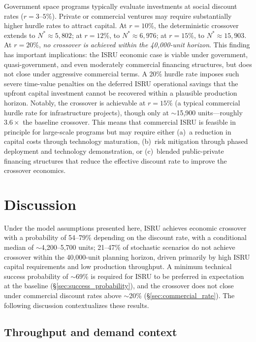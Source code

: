 \documentclass[preprint,12pt]{elsarticle}
\begin{document}
Government space programs typically evaluate investments at social discount rates ($r = 3$--$5\%$). Private or commercial ventures may require substantially higher hurdle rates to attract capital. At $r = 10\%$, the deterministic crossover extends to $N^* \approx 5{,}802$; at $r = 12\%$, to $N^* \approx 6{,}976$; at $r = 15\%$, to $N^* \approx 15{,}903$. At $r = 20\%$, \emph{no crossover is achieved within the 40{,}000-unit horizon}. This finding has important implications: the ISRU economic case is viable under government, quasi-government, and even moderately commercial financing structures, but does not close under aggressive commercial terms. A 20\% hurdle rate imposes such severe time-value penalties on the deferred ISRU operational savings that the upfront capital investment cannot be recovered within a plausible production horizon. Notably, the crossover is achievable at $r = 15\%$ (a typical commercial hurdle rate for infrastructure projects), though only at $\sim$15{,}900 units---roughly $3.6\times$ the baseline crossover. This means that commercial ISRU is feasible in principle for large-scale programs but may require either (a)~a reduction in capital costs through technology maturation, (b)~risk mitigation through phased deployment and technology demonstration, or (c)~blended public-private financing structures that reduce the effective discount rate to improve the crossover economics.

\section{Discussion}
\label{sec:discussion}

Under the model assumptions presented here, ISRU achieves economic crossover with a probability of 54--79\% depending on the discount rate, with a conditional median of $\sim$4{,}200--5{,}700 units; 21--47\% of stochastic scenarios do not achieve crossover within the 40{,}000-unit planning horizon, driven primarily by high ISRU capital requirements and low production throughput. A minimum technical success probability of $\sim$69\% is required for ISRU to be preferred in expectation at the baseline (\S\ref{sec:success_probability}), and the crossover does not close under commercial discount rates above $\sim$20\% (\S\ref{sec:commercial_rate}). The following discussion contextualizes these results.

\subsection{Throughput and demand context}
\label{sec:throughput}
\end{document}

